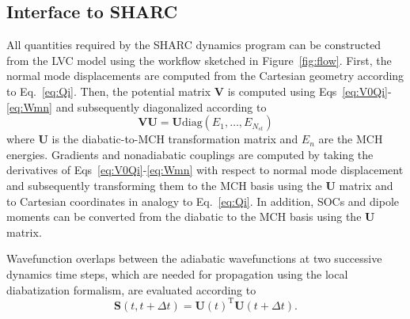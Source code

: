 \documentclass[twoside,twocolumn,9pt]{article}
\newcommand*{\TT}{^{\mathrm{T}}}
\begin{document}
\subsection{Interface to SHARC}
All quantities required by the SHARC dynamics program can be constructed from the LVC model using the workflow sketched in Figure~\ref{fig:flow}.
First, the normal mode displacements are computed from the Cartesian geometry according to Eq.~\eqref{eq:Qi}.
Then, the potential matrix $\mathbf{V}$ is computed using Eqs~\eqref{eq:V0Qi}-\eqref{eq:Wmn} and subsequently diagonalized according to
%
\begin{equation}
\mathbf{V}\mathbf{U}=\mathbf{U}\mathrm{diag}(E_1,\ldots,E_{N_{st}})
\end{equation}
%
where $\mathbf{U}$ is the diabatic-to-MCH transformation matrix and $E_n$ are the MCH energies.
Gradients and nonadiabatic couplings are computed by taking the derivatives of Eqs~\eqref{eq:V0Qi}-\eqref{eq:Wmn} with respect to normal mode displacement and subsequently transforming them to the MCH basis using the $\mathbf{U}$ matrix and to Cartesian coordinates in analogy to Eq.~\eqref{eq:Qi}.
In addition, SOCs and dipole moments can be converted from the diabatic to the MCH basis using the $\mathbf{U}$ matrix.




Wavefunction overlaps between the adiabatic wavefunctions at two successive dynamics time steps, which are needed for propagation using the local diabatization formalism,\cite{Granucci2001, locdiab} are evaluated according to
%
\begin{equation}
\mathbf{S}(t,t+\Delta t)=
\mathbf{U}(t)\TT\mathbf{U}(t+\Delta t)
.
\end{equation}
\end{document}
